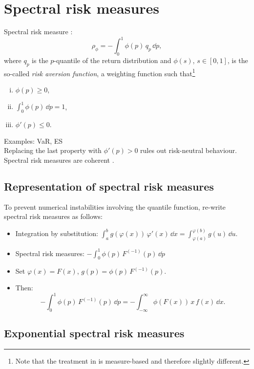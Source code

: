 \documentclass[square]{article} %
\theoremstyle{plain}
\theoremstyle{definition} %
\begin{document}
\section{Spectral risk measures}
\label{sec:spectr-risk-meas}

Spectral risk measure \citep{Acerbi2002,Cotter2006}:
\begin{equation*}
\rho_\phi = -\int_0^1 \phi(p)\, q_p\, \dd p,
\end{equation*}
where $q_p$ is the $p$-quantile of the return distribution and
$\phi(s)$, $s\in [0,1]$, is the so-called {\em risk aversion
  function\/}, a weighting function such that\footnote{Note that the
  treatment in \citep{Acerbi2002} is measure-based and therefore
  slightly different.} 
\begin{enumerate}[(i)]
\item $\phi(p)\geq 0$,
\item $\int_0^1\phi(p)\, \dd p=1$,
\item $\phi'(p)\leq 0$. 
\end{enumerate}
Examples: VaR, ES\\
Replacing the last property with $\phi'(p)>0$ rules out risk-neutral
behaviour. \\
Spectral risk measures are coherent \citep{Acerbi2002}. 

\subsection{Representation of spectral risk measures}
\label{sec:repr-spectr-risk}

To prevent numerical instabilities involving the quantile function,
re-write spectral risk measures as follows:
\begin{itemize}
\item Integration by substitution: $\displaystyle \int_a^b
  g(\varphi(x)) \,\varphi'(x)\, \dd x = \int_{\varphi(a)}^{\varphi(b)}
  g(u)\, \dd u$.
\item Spectral risk measures: $\displaystyle -\int_0^1 \phi(p) \,
  F^{(-1)}(p)\, \dd p$
\item Set $\varphi(x)=F(x)$, $g(p) = \phi(p)\, F^{(-1)}(p)$.
\item Then:
  \begin{equation*}
    -\int_0^1 \phi(p)\, F^{(-1)}(p)\, \dd p = -\int_{-\infty}^\infty
    \phi(F(x))\, x\, f(x)\, \dd x.
  \end{equation*}
\end{itemize}


\subsection{Exponential spectral risk measures}
\label{sec:expon-risk-meas}
\end{document}
